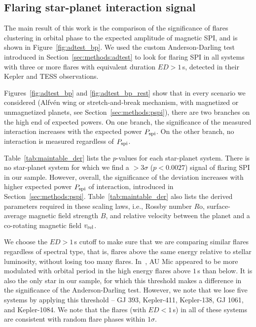 \documentclass[twocolumn]{aastex631}
\begin{document}
\subsection{Flaring star-planet interaction signal}
\label{sec:results:spi}
The main result of this work is the comparison of the significance of flares clustering in orbital phase to the expected amplitude of magnetic SPI, and is shown in Figure~\ref{fig:adtest_bp}. We used the custom Anderson-Darling test introduced in Section~\ref{sec:methods:adtest} to look for flaring SPI in all systems with three or more flares with equivalent duration $ED>1\,$s, detected in their Kepler and TESS observations. 

Figures~\ref{fig:adtest_bp} and \ref{fig:adtest_bp_rest} show that in every scenario we considered (Alfv\'en wing or stretch-and-break mechanism, with magnetized or unmagnetized planets, see Section~\ref{sec:methods:pspi}), there are two branches on the high end of expected powers. On one branch, the significance of the measured interaction increases with the expected power $P_{\rm spi}$. On the other branch, no interaction is measured regardless of $P_{\rm spi}$. 

Table~\ref{tab:maintable_der} lists the $p$-values for each star-planet system. There is no star-planet system for which we find a $>3\sigma$ ($p<0.0027$) signal of flaring SPI in our sample. However, overall, the significance of the deviation increases with higher expected power $P_{\rm spi}$ of interaction, introduced in Section~\ref{sec:methods:pspi}. Table~\ref{tab:maintable_der} also lists the derived parameters required in these scaling laws, i.e., Rossby number $R$o, surface-average magnetic field strength $B$, and relative velocity between the planet and a co-rotating magnetic field $v_{\rm rel}$. 

We choose the $ED>1\,$s cutoff to make sure that we are comparing similar flares regardless of spectral type, that is, flares above the same energy relative to stellar luminosity, without losing too many flares. In~\citet{ilin2022searching}, AU Mic appeared to be more modulated with orbital period in the high energy flares above $1\,$s than below. It is also the only star in our sample, for which this threshold makes a difference in the significance of the Anderson-Darling test. However, we note that we lose five systems by applying this threshold -- GJ 393, Kepler-411, Kepler-138, GJ 1061, and Kepler-1084. We note that the flares (with $ED<1\,$s) in all of these systems are consistent with random flare phases within $1\sigma$.
\end{document}
